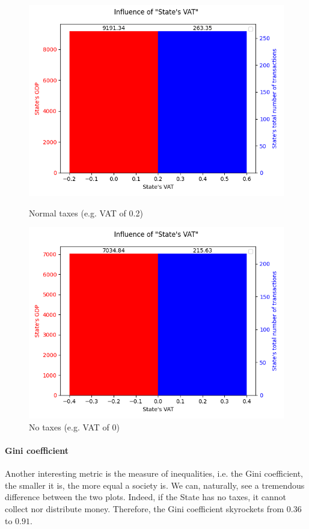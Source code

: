     \begin{figure}[H]
            \includegraphics[width=\linewidth]{img/exp/0_1_1.png}
            \caption{Normal taxes (e.g. VAT of 0.2)}
        \endminipage\hfill
            \includegraphics[width=\linewidth]{img/exp/0_2_1.png}
            \caption{No taxes (e.g. VAT of 0)}
        \endminipage\hfill
    \end{figure}

    \paragraph{Gini coefficient} Another interesting metric is the measure of inequalities, i.e. the Gini coefficient, the smaller it is, the more equal a society is. We can, naturally, see a tremendous difference between the two plots. Indeed, if the State has no taxes, it cannot collect nor distribute money. Therefore, the Gini coefficient skyrockets from $0.36$ to $0.91$.

